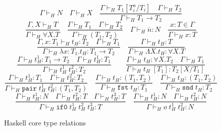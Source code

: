\begin{figure}
\[
\Gamma\vdash_{H}N
\quad
\Gamma\vdash_{H}X
\quad
\frac{\Gamma\vdash_{H}T_{1}[T^{a}_{i}/T_{i}]\quad\Gamma\vdash_{H}T_{2}}{\Gamma\vdash_{H}T_{1}\rightarrow T_{2}}
\]
\[
\frac{\Gamma ,X\vdash_{H}T}{\Gamma\vdash_{H}\forall X.T}
\quad
\frac{\Gamma\vdash_{H}T_{1}\quad\Gamma\vdash_{H}T_{2}}{\Gamma\vdash_{H}(T_{1},T_{2})}
\quad
\Gamma\vdash_{H}\overline{n}:N
\quad
\frac{x:T\in\Gamma}{\Gamma\vdash_{H}x:T}
\]
\[
\frac{\Gamma,x:T_{1}\vdash_{H}t_{H}:T_{2}\quad\Gamma\vdash_{H}T_{1}}{\Gamma\vdash_{H}\lambda x:T_{1}.t_{H}:T_{1}\rightarrow T_{2}}
\quad
\frac{\Gamma\vdash_{H}t_{H}:T}{\Gamma\vdash_{H}\Lambda X.t_{H}:\forall X.T}
\]
\[
\frac{\Gamma\vdash_{H}t_{H}^{1}:T_{1}\rightarrow T_{2}\quad\Gamma\vdash_{H}t_{H}^{1}:T_{1}}{\Gamma\vdash_{H}t_{H}^{1}\;t_{H}^{2}:T_{2}}
\quad
\quad
\frac{\Gamma\vdash_{H}t_{H}:\forall X.T_{2}\quad\Gamma\vdash_{H}T_{1}}{\Gamma\vdash_{H}t_{H}\;[T_{1}]:T_{2}[X/T_{1}]}
\]
\[
\frac{\Gamma\vdash_{H}t_{H}^{1}:T_{1}\quad\Gamma\vdash_{H}t_{H}^{2}:T_{2}}{\Gamma\vdash_{H}\mathtt{pair}\;t_{H}^{1}\;t_{H}^{2}:(T_{1},T_{2})}
\quad
\frac{\Gamma\vdash_{H}t_{H}:(T_{1},T_{2})}{\Gamma\vdash_{H}\mathtt{fst}\;t_{H}:T_{1}}
\quad
\frac{\Gamma\vdash_{H}t_{H}:(T_{1},T_{2})}{\Gamma\vdash_{H}\mathtt{snd}\;t_{H}:T_{2}}
\]
\[
\frac{\Gamma\vdash_{H}t_{H}^{1}:N\quad\Gamma\vdash_{H}t_{H}^{2}:T\quad\Gamma\vdash_{H}t_{H}^{3}:T}{\Gamma\vdash_{H}\mathtt{if0}\;t_{H}^{1}\;t_{H}^{2}\;t_{H}^{3}:T}
\quad
\frac{\Gamma\vdash_{H}t_{H}^{1}:N\quad\Gamma\vdash_{H}t_{H}^{2}:N}{\Gamma\vdash_{H}o\;t_{H}^{1}\;t_{H}^{2}:N}
\]
\caption{Haskell core type relations}
\label{hctr}
\end{figure}